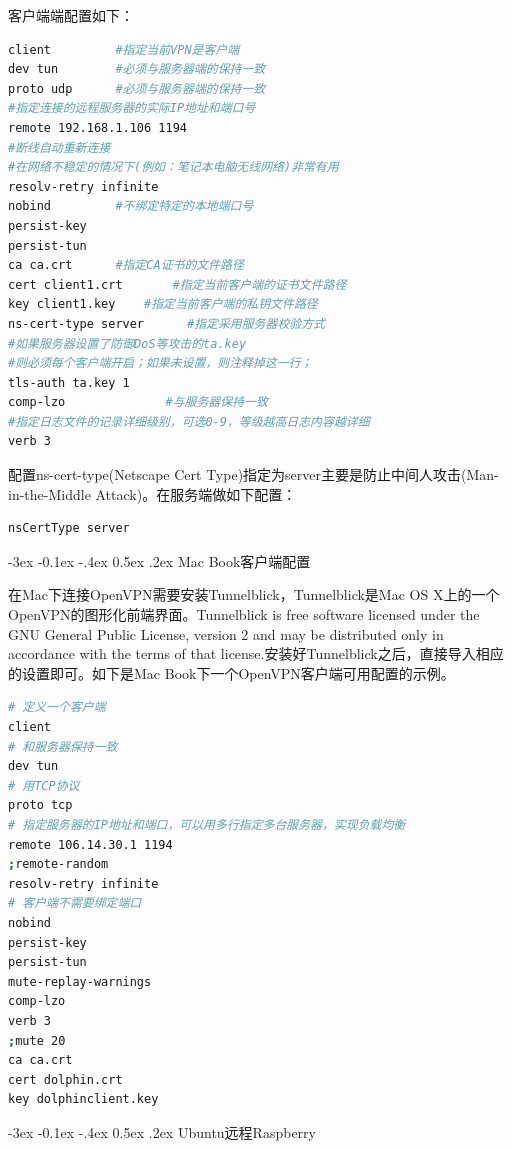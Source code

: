 \documentclass[12pt]{book}
\makeatletter
\numberwithin{dummy}{section}
\theoremstyle{ocrenumbox}
\theoremstyle{blacknumex}
\theoremstyle{blacknumbox}
\theoremstyle{ocrenum}
\renewcommand{\subsection}{\@startsection {subsection}{2}{\z@}
	{-3ex \@plus -0.1ex \@minus -.4ex}
	{0.5ex \@plus.2ex }
	{\normalfont\sffamily\bfseries}}
\makeatother
\begin{document}
客户端端配置如下：

\begin{lstlisting}[language=Bash]
client         #指定当前VPN是客户端
dev tun        #必须与服务器端的保持一致
proto udp      #必须与服务器端的保持一致
#指定连接的远程服务器的实际IP地址和端口号
remote 192.168.1.106 1194      
#断线自动重新连接
#在网络不稳定的情况下(例如：笔记本电脑无线网络)非常有用
resolv-retry infinite
nobind         #不绑定特定的本地端口号
persist-key
persist-tun
ca ca.crt      #指定CA证书的文件路径
cert client1.crt       #指定当前客户端的证书文件路径
key client1.key    #指定当前客户端的私钥文件路径
ns-cert-type server      #指定采用服务器校验方式
#如果服务器设置了防御DoS等攻击的ta.key
#则必须每个客户端开启；如果未设置，则注释掉这一行；
tls-auth ta.key 1     
comp-lzo              #与服务器保持一致
#指定日志文件的记录详细级别，可选0-9，等级越高日志内容越详细
verb 3                
\end{lstlisting}

配置ns-cert-type(Netscape Cert Type)指定为server主要是防止中间人攻击(Man-in-the-Middle Attack)。在服务端做如下配置：

\begin{lstlisting}[language=Bash]
nsCertType server
\end{lstlisting}

\subsection{Mac Book客户端配置}

在Mac下连接OpenVPN需要安装Tunnelblick，Tunnelblick是Mac OS X上的一个OpenVPN的图形化前端界面。Tunnelblick is free software licensed under the GNU General Public License, version 2 and may be distributed only in accordance with the terms of that license.安装好Tunnelblick之后，直接导入相应的设置即可。如下是Mac Book下一个OpenVPN客户端可用配置的示例。

\begin{lstlisting}[language=Bash]
# 定义一个客户端
client
# 和服务器保持一致
dev tun
# 用TCP协议
proto tcp
# 指定服务器的IP地址和端口，可以用多行指定多台服务器，实现负载均衡
remote 106.14.30.1 1194
;remote-random
resolv-retry infinite
# 客户端不需要绑定端口
nobind
persist-key
persist-tun
mute-replay-warnings
comp-lzo
verb 3
;mute 20
ca ca.crt
cert dolphin.crt
key dolphinclient.key
\end{lstlisting}


\subsection{Ubuntu远程Raspberry}
\end{document}
